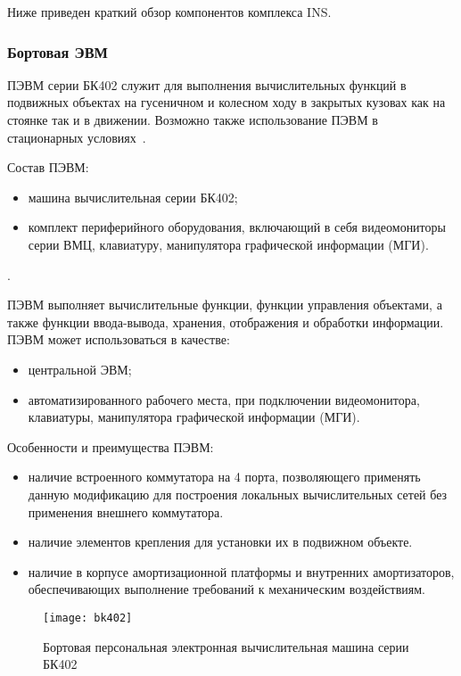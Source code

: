 Ниже приведен краткий обзор компонентов комплекса INS.

\subsubsection{Бортовая ЭВМ}
\label{sub:lit_review:ins:evm}
ПЭВМ серии БК402 служит для выполнения вычислительных функций в подвижных объектах на гусеничном и колесном ходу в закрытых кузовах
как на стоянке так и в движении. Возможно также использование ПЭВМ в стационарных условиях~\cite{bk402}.

Состав ПЭВМ:
\begin{itemize}
	\item машина вычислительная серии БК402;
	\item комплект периферийного оборудования, включающий в себя видеомониторы серии ВМЦ, клавиатуру, манипулятора графической информации (МГИ).
\end{itemize}.

ПЭВМ выполняет вычислительные функции, функции управления объектами, а также функции ввода-вывода, хранения, отображения и обработки информации.
ПЭВМ может  использоваться в  качестве:
\begin{itemize}
	\item центральной ЭВМ;
	\item автоматизированного рабочего места, при подключении видеомонитора, клавиатуры, манипулятора графической информации (МГИ).
\end{itemize}

Особенности и преимущества ПЭВМ:
\begin{itemize}
	\item наличие встроенного коммутатора на 4 порта, позволяющего применять данную модификацию для  построения локальных вычислительных сетей без применения внешнего коммутатора.
	\item наличие элементов крепления для установки их в подвижном объекте.
	\item наличие в корпусе амортизационной платформы и внутренних амортизаторов, обеспечивающих  выполнение требований к механическим воздействиям.
\end{itemize}

\begin{figure}[ht]
	\centering
	\texttt{[image: bk402]}
	\caption{Бортовая персональная электронная вычислительная машина серии БК402~\cite{bk402}}
	\label{fig:lit_reiview:ins:evm:bk402}
\end{figure}

